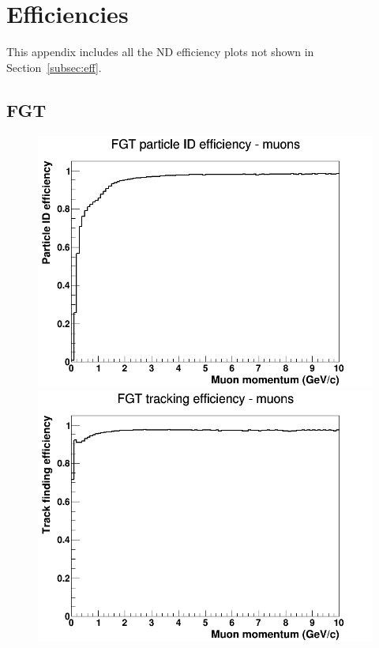 \section{Efficiencies}
\label{app:eff_app}
This appendix includes all the ND efficiency plots not shown in Section~\ref{subsec:eff}. 
\subsection{FGT}
\begin{figure}[h]
\includegraphics[width=\linewidth]{eff_plots/fgt_pideff_muon.png}
\endminipage
{}
\includegraphics[width=\linewidth]{eff_plots/fgt_trkeff_muon.png}
\endminipage
\newline

\end{figure}

